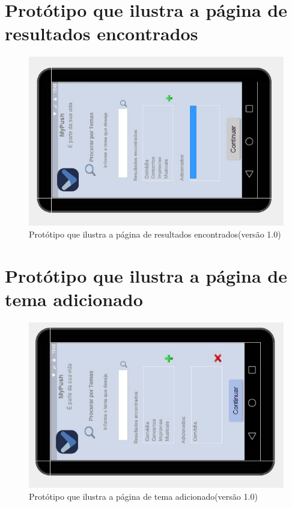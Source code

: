 \begin{apendicesenv}
    \pagebreak
      \section*{Protótipo que ilustra a página de resultados encontrados}

    \begin{figure}[!htbp]
      \centering
      \includegraphics[scale=0.9, angle=-90]{editaveis/figuras/prototipo_alta_fidelidade_v1/1_3}
      \caption{Protótipo que ilustra a página de resultados encontrados(versão 1.0)}
      \label{v1}
    \end{figure}
    
    \pagebreak
      \section*{Protótipo que ilustra a página de tema adicionado}

    \begin{figure}[!htbp]
      \centering
      \includegraphics[scale=0.9, angle=-90]{editaveis/figuras/prototipo_alta_fidelidade_v1/1_4}
      \caption{Protótipo que ilustra a página de tema adicionado(versão 1.0)}
      \label{v1}
    \end{figure}
    

\end{apendicesenv}
